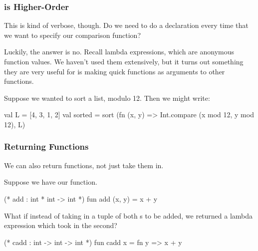\documentclass[aspectratio=169, handout]{beamer}
\begin{document}
\begin{frame}[fragile]
  \frametitle{ is Higher-Order}

  This is kind of verbose, though. Do we need to do a  declaration every
  time that we want to specify our comparison function?

  \pause
  \vspace{\fill}

  Luckily, the answer is no. Recall lambda expressions, which are anonymous function
  values. We haven't used them extensively, but it turns out something they are very
  useful for is making quick functions as arguments to other functions.

  \pause
  \vspace{\fill}

  Suppose we wanted to sort a list, modulo 12. Then we might write:

  \pause
  \begin{codeblock}
    val L = [4, 3, 1, 2]
    val sorted =
      sort (fn (x, y) => Int.compare (x mod 12,  y mod 12), L)
  \end{codeblock}
\end{frame}

\begin{frame}[fragile]
  \frametitle{Returning Functions}

  We can also return functions, not just take them in.

  \pause
  \vspace{\fill}


  \pause
  Suppose we have our  function.

  \begin{codeblock}
    (* add : int * int -> int *)
    fun add (x, y) = x + y
  \end{codeblock}

  \pause
  \vspace{\fill}

  What if instead of taking in a tuple of both s to be added,
  we returned a lambda expression which took in the second?

  \pause
  \begin{codeblock}
    (* cadd : int -> int -> int *)
    fun cadd x = fn y => x + y
  \end{codeblock}

  \pause
  \vspace{\fill}

\end{frame}
\end{document}
